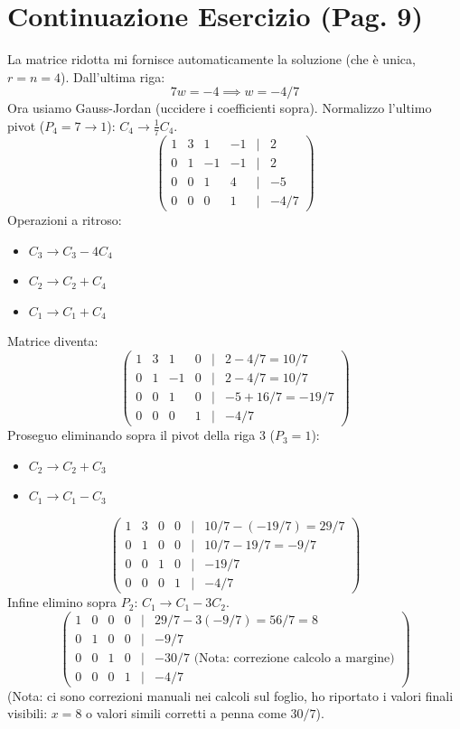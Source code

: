\section{Continuazione Esercizio (Pag. 9)}

La matrice ridotta mi fornisce automaticamente la soluzione (che è unica, $r=n=4$).
Dall'ultima riga:
\[ 7w = -4 \implies w = -4/7 \]
Ora usiamo Gauss-Jordan (uccidere i coefficienti sopra).
Normalizzo l'ultimo pivot ($P_4=7 \to 1$): $C_4 \to \frac{1}{7}C_4$.
\[
\begin{pmatrix}
1 & 3 & 1 & -1 & | & 2 \\
0 & 1 & -1 & -1 & | & 2 \\
0 & 0 & 1 & 4 & | & -5 \\
0 & 0 & 0 & 1 & | & -4/7
\end{pmatrix}
\]
Operazioni a ritroso:
\begin{itemize}
    \item $C_3 \to C_3 - 4C_4$
    \item $C_2 \to C_2 + C_4$
    \item $C_1 \to C_1 + C_4$
\end{itemize}
Matrice diventa:
\[
\begin{pmatrix}
1 & 3 & 1 & 0 & | & 2 - 4/7 = 10/7 \\
0 & 1 & -1 & 0 & | & 2 - 4/7 = 10/7 \\
0 & 0 & 1 & 0 & | & -5 + 16/7 = -19/7 \\
0 & 0 & 0 & 1 & | & -4/7
\end{pmatrix}
\]
Proseguo eliminando sopra il pivot della riga 3 ($P_3=1$):
\begin{itemize}
    \item $C_2 \to C_2 + C_3$
    \item $C_1 \to C_1 - C_3$
\end{itemize}
\[
\begin{pmatrix}
1 & 3 & 0 & 0 & | & 10/7 - (-19/7) = 29/7 \\
0 & 1 & 0 & 0 & | & 10/7 - 19/7 = -9/7 \\
0 & 0 & 1 & 0 & | & -19/7 \\
0 & 0 & 0 & 1 & | & -4/7
\end{pmatrix}
\]
Infine elimino sopra $P_2$: $C_1 \to C_1 - 3C_2$.
\[
\begin{pmatrix}
1 & 0 & 0 & 0 & | & 29/7 - 3(-9/7) = 56/7 = 8 \\
0 & 1 & 0 & 0 & | & -9/7 \\
0 & 0 & 1 & 0 & | & -30/7 \text{ (Nota: correzione calcolo a margine)}\\
0 & 0 & 0 & 1 & | & -4/7
\end{pmatrix}
\]
(Nota: ci sono correzioni manuali nei calcoli sul foglio, ho riportato i valori finali visibili: $x=8$ o valori simili corretti a penna come $30/7$).

